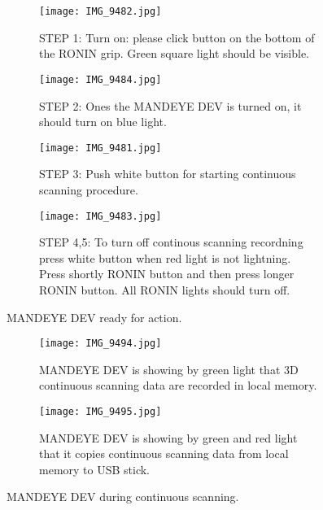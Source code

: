 \begin{figure}
	\centering
	\begin{subfigure}[b]{0.45\textwidth}
		\centering
		\texttt{[image: IMG\_9482.jpg]}
		\caption{STEP 1: Turn on: please click button on the bottom of the RONIN grip. Green square light should be visible.}
		\label{fig:m12}
	\end{subfigure}
	\hfill
	\begin{subfigure}[b]{0.45\textwidth}
		\centering
		\texttt{[image: IMG\_9484.jpg]}
		\caption{STEP 2: Ones the MANDEYE DEV is turned on, it should turn on blue light.}
		\label{fig:m23}
	\end{subfigure}
	\hfill
	\begin{subfigure}[b]{0.45\textwidth}
		\centering
		\texttt{[image: IMG\_9481.jpg]}
		\caption{STEP 3: Push white button for starting continuous scanning procedure.}
		\label{fig:m24}
	\end{subfigure}
	\hfill
	\begin{subfigure}[b]{0.45\textwidth}
		\centering
		\texttt{[image: IMG\_9483.jpg]}
		\caption{STEP 4,5: To turn off continous scanning recordning press white button when red light is not lightning. Press shortly RONIN button and then press longer RONIN button. All RONIN lights should turn off.}
		\label{fig:m25}
	\end{subfigure}
	\caption{MANDEYE DEV ready for action.}
	\label{fig:mandeye_harware2}
\end{figure}

\begin{figure}
	\centering
	\begin{subfigure}[b]{0.45\textwidth}
		\centering
		\texttt{[image: IMG\_9494.jpg]}
		\caption{MANDEYE DEV is showing by green light that 3D continuous scanning data are recorded in local memory.}
		\label{fig:m16}
	\end{subfigure}
	\hfill
	\begin{subfigure}[b]{0.45\textwidth}
		\centering
		\texttt{[image: IMG\_9495.jpg]}
		\caption{MANDEYE DEV is showing by green and red light that it copies continuous scanning data from local memory to USB stick.}
		\label{fig:m26}
	\end{subfigure}
	\caption{MANDEYE DEV during continuous scanning.}
	\label{fig:mandeye_harware3}
\end{figure}

